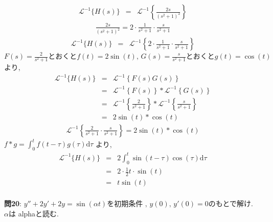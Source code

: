 ﻿\documentclass[a4j]{jarticle}
\begin{document}
\begin{eqnarray*}
\mathcal{L}^{-1} \{ H(s) \} &=& \mathcal{L}^{-1} \left\{ \frac{2s}{(s^2+1)^2} \right\}
\end{eqnarray*}
\begin{eqnarray*}
\frac{2s}{(s^2+1)^2} = 2\cdot\frac{1}{s^2+1}\cdot\frac{s}{s^2+1}
\end{eqnarray*}
\begin{eqnarray*}
\mathcal{L}^{-1} \{ H(s) \} &=& \mathcal{L}^{-1} \left\{ 2\cdot\frac{1}{s^2+1}\cdot\frac{s}{s^2+1} \right\}
\end{eqnarray*}
\( F(s)=\frac{2}{s^2+1} \text{とおくと} f(t) = 2\sin(t) ,\,
   G(s)=\frac{s}{s^2+1} \text{とおくと} g(t) = \cos(t) \) より,
%
\begin{eqnarray*}
\mathcal{L}^{-1} \{ H(s) \} &=& \mathcal{L}^{-1} \left\{ F(s)G(s) \right\} \\
                            &=& \mathcal{L}^{-1} \left\{ F(s) \right\} * \mathcal{L}^{-1} \left\{ G(s) \right\} \\
                            &=& \mathcal{L}^{-1} \left\{ \frac{2}{s^2+1} \right\} * \mathcal{L}^{-1} \left\{ \frac{s}{s^2+1} \right\} \\
                            &=& 2\sin(t) * \cos(t)
\end{eqnarray*}
\begin{eqnarray*}
\mathcal{L}^{-1} \left\{ \frac{2}{s^2+1}\cdot\frac{s}{s^2+1} \right\} = 2\sin(t) * \cos(t)
\end{eqnarray*}
\( f * g = \int_0^t{f(t-\tau)g(\tau)\mathrm{d}\tau } \) より,
\begin{eqnarray*}
\mathcal{L}^{-1}\{ H(s) \} &=& 2\int_0^t{\sin(t-\tau)\cos(\tau)\mathrm{d}\tau } \\
                           &=& 2 \cdot \frac{1}{2}t\cdot \sin(t) \\
                           &=& t \sin(t) \\
\end{eqnarray*}

\noindent
\large{\bf{問20}}: \( y'' + 2y' + 2y = \sin(\alpha t) \)を初期条件 \( ,\, y(0) ,\, y'(0) = 0 \)のもとで解け. \\

\( \alpha \)は alphaと読む.
\end{document}
